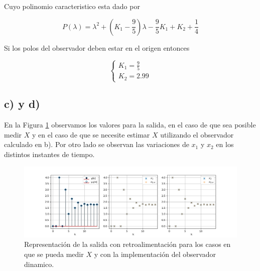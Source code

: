 \documentclass[11pt,a4paper]{article}
\newcommand{\siseq}[1]{ \left\{ \begin{array}{c}
    #1
\end{array} \right. }
\begin{document}
    Cuyo polinomio caracteristico esta dado por 

    \begin{equation}
        P(\lambda) = \lambda^2 + \left( K_1 - \frac{9}{5} \right) \lambda - \frac{9}{5}K_1 + K_2 + \frac{1}{4}
    \end{equation}

    Si los polos del observador deben estar en el origen entonces 

    \begin{equation}
        \siseq{
            K_1 = \frac{9}{5} \\ 
            K_2 = 2.99
        }
    \end{equation}

    \subsection*{c) y d)}

    En la Figura \ref{fig:11} observamos los valores para la salida, en el caso de que sea posible medir $X$ y en el caso 
    de que se necesite estimar $X$ utilizando el observador calculado en b). Por otro lado se observan las variaciones de 
    $x_1$ y $x_2$ en los distintos instantes de tiempo.

    \begin{figure}
        \centering
        \includegraphics[width=\textwidth]{Img/11-c-d.jpg}
        \caption{Representación de la salida con retroalimentación para los casos en que se pueda medir $X$ y con la implementación del observador dinamico.}
        \label{fig:11}
    \end{figure}
\end{document}

